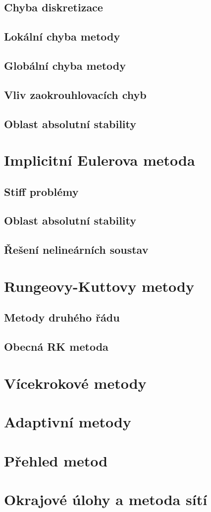 \documentclass[a4paper, 12pt]{book}
\theoremstyle{definition}
\begin{document}
\subsection{Chyba diskretizace}
\subsection{Lokální chyba metody}
\subsection{Globální chyba metody}
\subsection{Vliv zaokrouhlovacích chyb}
\subsection{Oblast absolutní stability}

\section{Implicitní Eulerova metoda}
\subsection{Stiff problémy}
\subsection{Oblast absolutní stability}
\subsection{Řešení nelineárních soustav}

\section{Rungeovy-Kuttovy metody}
\subsection{Metody druhého řádu}
\subsection{Obecná RK metoda}


\section{Vícekrokové metody}

\section{Adaptivní metody}

\section{Přehled metod}

\section{Okrajové úlohy a metoda sítí}
\end{document}
